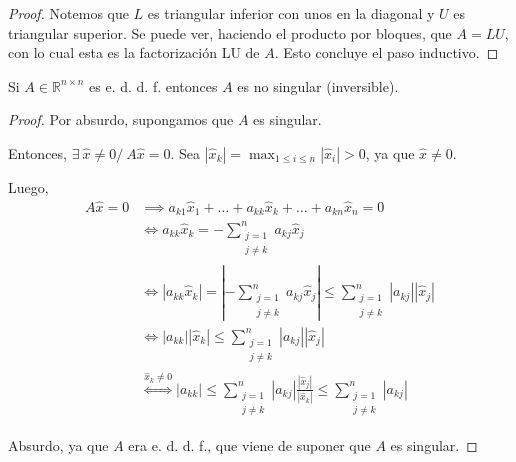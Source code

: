 \begin{propo}
\begin{proof}
Notemos que $L$ es triangular inferior con unos en la diagonal y $U$ es triangular superior. Se puede ver, haciendo el producto por bloques, que $A = LU$, con lo cual esta es la factorización LU de $A$. Esto concluye el paso inductivo.

\end{proof}
\end{propo}

\begin{propo}
Si $A \in \mathbb{R}^{n \times n}$ es e. d. d. f. entonces $A$ es no singular (inversible).

\begin{proof}
Por absurdo, supongamos que $A$ es singular.

Entonces, $\exists\ \hat{x} \neq 0 /\ A\hat{x} = 0$.
Sea $|\hat{x}_k| = \max_{1 \leq i \leq n}{|\hat{x}_i|} > 0$, ya que $\hat{x} \neq 0$.

Luego,
\begin{align*}
A\hat{x} = 0 &\implies a_{k1}\hat{x}_1 + \dots + a_{kk}\hat{x}_k + \dots + a_{kn}\hat{x}_n = 0 \\
&\iff a_{kk}\hat{x}_k = - \sum_{\substack{j = 1\\ j \neq k}}^{n}{a_{kj}\hat{x}_j} \\
&\iff |a_{kk}\hat{x}_k| = |- \sum_{\substack{j = 1\\ j \neq k}}^{n}{a_{kj}\hat{x}_j}|
	\leq \sum_{\substack{j = 1\\ j \neq k}}^{n}{|a_{kj}||\hat{x}_j|} \\
&\iff |a_{kk}||\hat{x}_k| \leq \sum_{\substack{j = 1\\ j \neq k}}^{n}{|a_{kj}||\hat{x}_j|} \\
&\overset{\hat{x}_k \neq 0}{\iff} |a_{kk}| \leq \sum_{\substack{j = 1\\ j \neq k}}^{n}{|a_{kj}|\frac{|\hat{x}_j|}{|\hat{x}_k|}}
	\leq \sum_{\substack{j = 1\\ j \neq k}}^{n}{|a_{kj}|}
\end{align*}

Absurdo, ya que $A$ era e. d. d. f., que viene de suponer que $A$ es singular.
\end{proof}
\end{propo}

